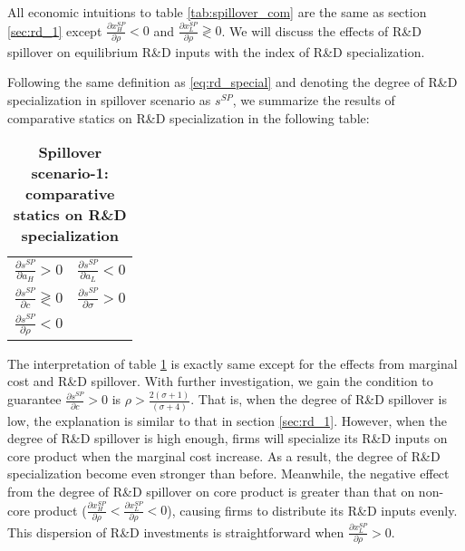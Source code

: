 \documentclass[12pt]{article}
\begin{document}
All economic intuitions to table \ref{tab:spillover_com} are the same as section \ref{sec:rd_1} except $\frac{\partial x_H^{SP}}{\partial \rho} < 0$ and $\frac{\partial x_L^{SP}}{\partial \rho} \gtrless 0$.
We will discuss the effects of R\&D spillover on equilibrium R\&D inputs with the index of R\&D specialization.

Following the same definition as \eqref{eq:rd_special} and denoting the degree of R\&D specialization in spillover scenario as $s^{SP}$, we summarize the results of comparative statics on R\&D specialization in the following table:
\begin{table}[h]
    \centering
    \caption{\textbf{Spillover scenario-1: comparative statics on R\&D specialization}}
    \label{tab:spillover_special}
    \begin{tabular}{ll}
      $\frac{\partial s^{SP}}{\partial a_H} > 0$ & $\frac{\partial s^{SP}}{\partial a_L} < 0$ \\
      $\frac{\partial s^{SP}}{\partial c} \gtrless 0$ & $\frac{\partial s^{SP}}{\partial \sigma} > 0$ \\
      $\frac{\partial s^{SP}}{\partial \rho} < 0$ & 
    \end{tabular}
\end{table}

The interpretation of table \ref{tab:spillover_special} is exactly same except for the effects from marginal cost and R\&D spillover.
With further investigation, we gain the condition to guarantee $\frac{\partial s^{SP}}{\partial c} > 0$ is $\rho > \frac{2 (\sigma + 1)}{(\sigma + 4)}$.
That is, when the degree of R\&D spillover is low, the explanation is similar to that in section \ref{sec:rd_1}.
However, when the degree of R\&D spillover is high enough, firms will specialize its R\&D inputs on core product when the marginal cost increase.
As a result, the degree of R\&D specialization become even stronger than before.
Meanwhile, the negative effect from the degree of R\&D spillover on core product is greater than that on non-core product ($\frac{\partial x_H^{SP}}{\partial \rho} < \frac{\partial x_L^{SP}}{\partial \rho} < 0$), causing firms to distribute its R\&D inputs evenly.
This dispersion of R\&D investments is straightforward when $\frac{\partial x_L^{SP}}{\partial \rho} > 0$.
\end{document}
